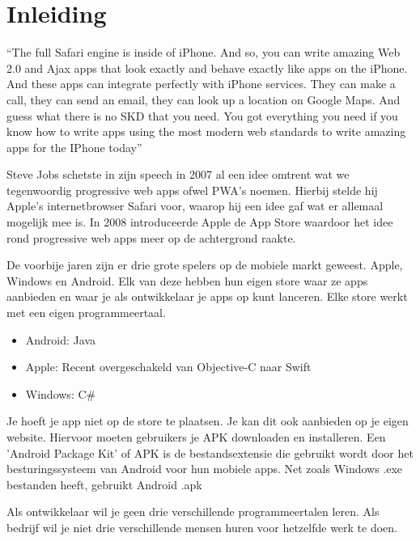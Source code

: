 

\chapter{Inleiding}
\label{ch:inleiding}

\nocite{*}

“The full Safari engine is inside of iPhone. And so, you can write amazing Web 2.0 and Ajax apps that look exactly and behave exactly like apps on the iPhone. And these apps can integrate perfectly with iPhone services. They can make a call, they can send an email, they can look up a location on Google Maps. And guess what there is no SKD that you need. You got everything you need if you know how to write apps using the most modern web standards to write amazing apps for the IPhone today” ~\autocite{keynote2007}

Steve Jobs schetste in zijn speech in 2007 al een idee omtrent wat we tegenwoordig progressive web apps ofwel PWA's noemen. Hierbij stelde hij Apple's internetbrowser Safari voor, waarop hij een idee gaf wat er allemaal mogelijk mee is. In 2008 introduceerde Apple de App Store waardoor het idee rond progressive web apps meer op de achtergrond raakte.

De voorbije jaren zijn er drie grote spelers op de mobiele markt geweest. Apple, Windows en Android. Elk van deze hebben hun eigen store waar ze apps aanbieden en waar je als ontwikkelaar je apps op kunt lanceren. Elke store werkt met een eigen programmeertaal.
\begin{itemize}  
	\item Android: Java
	\item Apple: Recent overgeschakeld van Objective-C naar Swift
	\item Windows: C\#
\end{itemize}

Je hoeft je app niet op de store te plaatsen. Je kan dit ook aanbieden op je eigen website. Hiervoor moeten gebruikers je APK downloaden en installeren. Een 'Android Package Kit' of APK is de bestandsextensie die gebruikt wordt door het besturingssysteem van Android voor hun mobiele apps. Net zoals Windows .exe bestanden heeft, gebruikt Android .apk ~\autocite{apk}

Als ontwikkelaar wil je geen drie verschillende programmeertalen leren. Als bedrijf wil je niet drie verschillende mensen huren voor hetzelfde werk te doen.

